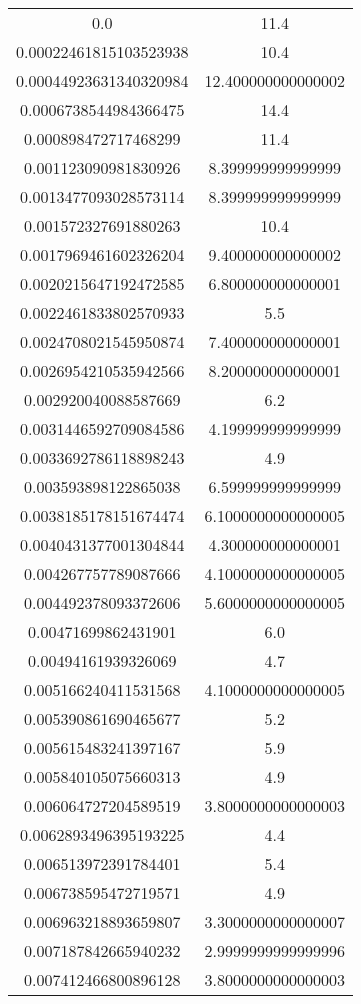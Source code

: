 \begin{table}
\begin{tabular}{S[]S[]}
0.0 & 11.4\\
0.00022461815103523938 & 10.4\\
0.00044923631340320984 & 12.400000000000002\\
0.0006738544984366475 & 14.4\\
0.000898472717468299 & 11.4\\
0.001123090981830926 & 8.399999999999999\\
0.0013477093028573114 & 8.399999999999999\\
0.001572327691880263 & 10.4\\
0.0017969461602326204 & 9.400000000000002\\
0.0020215647192472585 & 6.800000000000001\\
0.0022461833802570933 & 5.5\\
0.0024708021545950874 & 7.400000000000001\\
0.0026954210535942566 & 8.200000000000001\\
0.002920040088587669 & 6.2\\
0.0031446592709084586 & 4.199999999999999\\
0.0033692786118898243 & 4.9\\
0.003593898122865038 & 6.599999999999999\\
0.0038185178151674474 & 6.1000000000000005\\
0.0040431377001304844 & 4.300000000000001\\
0.004267757789087666 & 4.1000000000000005\\
0.004492378093372606 & 5.6000000000000005\\
0.00471699862431901 & 6.0\\
0.00494161939326069 & 4.7\\
0.005166240411531568 & 4.1000000000000005\\
0.005390861690465677 & 5.2\\
0.005615483241397167 & 5.9\\
0.005840105075660313 & 4.9\\
0.006064727204589519 & 3.8000000000000003\\
0.0062893496395193225 & 4.4\\
0.006513972391784401 & 5.4\\
0.006738595472719571 & 4.9\\
0.006963218893659807 & 3.3000000000000007\\
0.007187842665940232 & 2.9999999999999996\\
0.007412466800896128 & 3.8000000000000003\\

\end{tabular}
\end{table}
